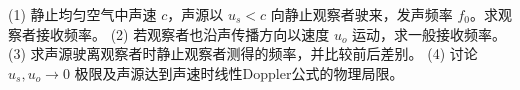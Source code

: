 (1) 静止均匀空气中声速 \(c\)，声源以 \(u_s<c\) 向静止观察者驶来，发声频率 \(f_0\)。求观察者接收频率。
(2) 若观察者也沿声传播方向以速度 \(u_o\) 运动，求一般接收频率。
(3) 求声源驶离观察者时静止观察者测得的频率，并比较前后差别。
(4) 讨论 \(u_s,u_o\to0\) 极限及声源达到声速时线性Doppler公式的物理局限。
